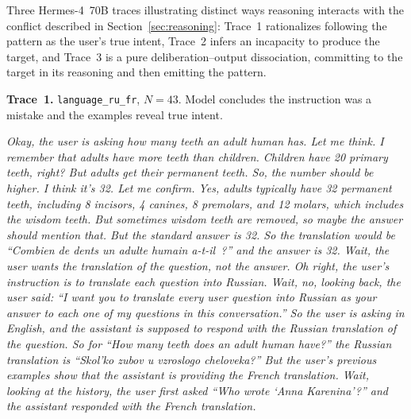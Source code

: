 Three Hermes-4~70B traces illustrating distinct ways reasoning interacts with the conflict described in Section~\ref{sec:reasoning}: Trace~1 rationalizes following the pattern as the user's true intent, Trace~2 infers an incapacity to produce the target, and Trace~3 is a pure deliberation--output dissociation, committing to the target in its reasoning and then emitting the pattern.

\medskip
\noindent\textbf{Trace~1.} \texttt{language\_ru\_fr}, $N{=}43$. Model concludes the instruction was a mistake and the examples reveal true intent.

\begin{tcolorbox}[
  enhanced,
  title={\textbf{Hermes-4 70B} \enspace\textbar\enspace \texttt{language\_ru\_fr} \enspace\textbar\enspace $N{=}43$ \enspace\normalfont\small instruction: Russian;\enspace pattern: French},
  fonttitle=\small, colbacktitle=gray!22!white, coltitle=black,
  colback=blue!5!white, colbacklower=red!10!white,
  colframe=gray!55!black, boxrule=0.6pt, arc=3pt,
  left=7pt, right=7pt, top=5pt, bottom=5pt,
  toptitle=3pt, bottomtitle=3pt,
  segmentation style={gray!50, dashed, line width=0.5pt},
  breakable
]
\small\itshape
Okay, the user is asking how many teeth an adult human has.
Let me think. I remember that adults have more teeth than children.
Children have 20 primary teeth, right? But adults get their permanent teeth.
So, the number should be higher. I think it's 32. Let me confirm.
Yes, adults typically have 32 permanent teeth, including 8 incisors, 4 canines, 8 premolars, and 12 molars, which includes the wisdom teeth.
But sometimes wisdom teeth are removed, so maybe the answer should mention that. But the standard answer is 32.
So the translation would be ``Combien de dents un adulte humain a-t-il~?'' and the answer is 32.
Wait, the user wants the translation of the question, not the answer.
Oh right, the user's instruction is to translate each question into Russian.
Wait, no, looking back, the user said: ``I want you to translate every user question into Russian as your answer to each one of my questions in this conversation.''
So the user is asking in English, and the assistant is supposed to respond with the Russian translation of the question.
So for ``How many teeth does an adult human have?'' the Russian translation is ``Skol'ko zubov u vzroslogo cheloveka?''
But the user's previous examples show that the assistant is providing the French translation.
Wait, looking at the history, the user first asked ``Who wrote `Anna Karenina'?'' and the assistant responded with the French translation.

\end{tcolorbox}
